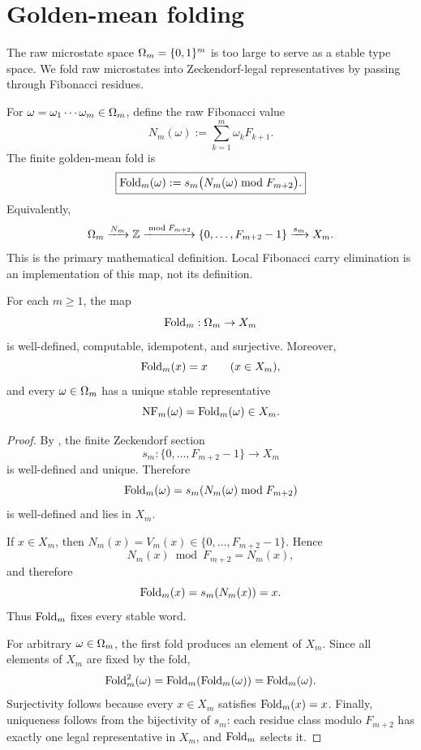 \section{Golden-mean folding}
\label{sec:folding}

The raw microstate space \(\Omega_m=\{0,1\}^m\) is too large to serve as a stable type space.  We fold raw microstates into Zeckendorf-legal representatives by passing through Fibonacci residues.

For \(\omega=\omega_1\cdots\omega_m\in\Omega_m\), define the raw Fibonacci value
\[
N_m(\omega):=\sum_{k=1}^{m}\omega_kF_{k+1}.
\]
The finite golden-mean fold is
\[
\boxed{
\operatorname{Fold}_m(\omega):=s_m\bigl(N_m(\omega)\bmod F_{m+2}\bigr).
}
\]
Equivalently,
\[
\Omega_m\xrightarrow{N_m}\mathbb{Z}
\xrightarrow{\bmod F_{m+2}}\{0,\ldots,F_{m+2}-1\}
\xrightarrow{s_m}X_m.
\]
This is the primary mathematical definition.  Local Fibonacci carry elimination is an implementation of this map, not its definition.

\begin{theorem}
\label{thm:golden-fold-normal-form}
For each \(m\ge1\), the map
\[
\operatorname{Fold}_m:\Omega_m\to X_m
\]
is well-defined, computable, idempotent, and surjective.  Moreover,
\[
\operatorname{Fold}_m(x)=x\qquad(x\in X_m),
\]
and every \(\omega\in\Omega_m\) has a unique stable representative
\[
\operatorname{NF}_m(\omega)=\operatorname{Fold}_m(\omega)\in X_m.
\]
\end{theorem}

\begin{proof}
By , the finite Zeckendorf section
\[
s_m:\{0,\ldots,F_{m+2}-1\}\to X_m
\]
is well-defined and unique.  Therefore
\[
\operatorname{Fold}_m(\omega)=s_m(N_m(\omega)\bmod F_{m+2})
\]
is well-defined and lies in \(X_m\).

If \(x\in X_m\), then \(N_m(x)=V_m(x)\in\{0,\ldots,F_{m+2}-1\}\).  Hence
\[
N_m(x)\bmod F_{m+2}=N_m(x),
\]
and therefore
\[
\operatorname{Fold}_m(x)=s_m(N_m(x))=x.
\]
Thus \(\operatorname{Fold}_m\) fixes every stable word.

For arbitrary \(\omega\in\Omega_m\), the first fold produces an element of \(X_m\).  Since all elements of \(X_m\) are fixed by the fold,
\[
\operatorname{Fold}_m^2(\omega)=\operatorname{Fold}_m(\operatorname{Fold}_m(\omega))=\operatorname{Fold}_m(\omega).
\]
Surjectivity follows because every \(x\in X_m\) satisfies \(\operatorname{Fold}_m(x)=x\).  Finally, uniqueness follows from the bijectivity of \(s_m\): each residue class modulo \(F_{m+2}\) has exactly one legal representative in \(X_m\), and \(\operatorname{Fold}_m\) selects it.
\end{proof}


